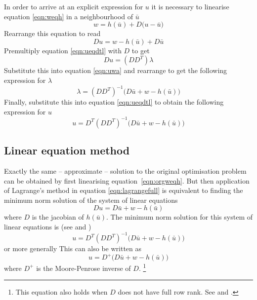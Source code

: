 \documentclass[english,memorandum,old,sectionpage]{cpbart}
\newcommand*{\Wlin}[1]{D #1 + w - h(#1)}
\newcommand*{\ubar}{\bar{u}}
\begin{document}
In order to arrive at an explicit expression for $u$ it is necessary
to linearise equation \eqref{eqn:weqh}
in a neighbourhood of $\ubar$
\begin{equation} \label{eqn:uw}
w = h(\ubar) + D \bigl( u - \ubar \bigr)
\end{equation}
%
Rearrange this equation to read
\begin{equation} \label{eqn:uwa}
D u =  w - h(\ubar) + D\ubar
\end{equation}
%
Premultiply equation \eqref{eqn:ueqdtl} with $D$ to get
\begin{equation}
D u = (D D^T) \lambda
\end{equation}
%
Substitute this into equation \eqref{eqn:uwa} and rearrange to get
the following expression for $\lambda$
\begin{equation}
\lambda = (D D^T)^{-1} \bigl( \Wlin{\ubar} \bigr)
\end{equation}
%
Finally, substitute this into equation \eqref{eqn:ueqdtl} to obtain
the following expression for $u$
\begin{equation}
u = D^T (D D^T)^{-1} \bigl( \Wlin{\ubar} \bigr)
\end{equation}

\subsection*{Linear equation method}

Exactly the same -- approximate -- solution to the original
optimisation problem can be obtained by first linearising
equation~\eqref{eqn:orgweqh}.
But then application of Lagrange's method  in equation \eqref{eqn:lagrangefull}
is equivalent to finding the minimum norm solution of the system of
linear equations
%
\begin{equation}
D u =  D \ubar+ w - h(\ubar)
\end{equation}
%
where $D$ is the jacobian of $h(\ubar)$.
The minimum norm solution for this system of linear equations is
(see \cite*{nlaopt} and \cite*{clineplemmons})
%
\begin{equation}\label{eqn:slnfrank}
u = D^T (D D^T)^{-1} \bigl( \Wlin{\ubar} \bigr)
\end{equation}
or more generally
This can also be written as
\begin{equation}\label{eqn:slnmp1}
u = D^{+} \bigl( \Wlin{\ubar} \bigr)
\end{equation}
where $D^{+}$ is the Moore-Penrose inverse of $D$.%
\footnote{This equation also holds when $D$ does not have full row rank.
See \cite{nlaopt} and \cite{matcomp}.}
\end{document}
